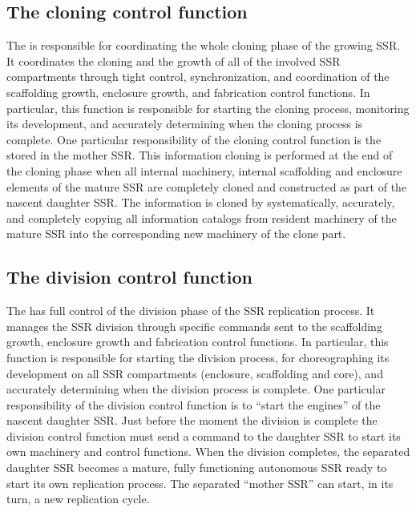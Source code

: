 \subsection[The cloning control function]{The cloning control function}

The  is responsible for coordinating the whole cloning phase of the
growing SSR. It coordinates the cloning and the
growth of all of the involved SSR compartments through tight control,
synchronization, and coordination of the scaffolding growth, enclosure
growth, and fabrication control functions. In particular, this function is responsible
for starting the cloning process, monitoring its development,
and accurately determining when the cloning process is complete. One
particular responsibility of the cloning control function is the
 stored in the mother SSR. This
information cloning is performed at the end of the cloning phase when
all internal machinery, internal scaffolding and enclosure elements of
the mature SSR are completely cloned and constructed as part of the
nascent daughter SSR. The information is cloned by systematically,
accurately, and completely copying all information catalogs from
resident machinery of the mature SSR into the corresponding new
machinery of the clone part.

\subsection[The division control function]{The division control function}

The  has full control of the division phase of the SSR replication
process. It manages the SSR division through specific commands sent to
the scaffolding growth, enclosure growth and fabrication control
functions.  In particular, this function is responsible for starting the
division process, for choreographing its development on all SSR
compartments (enclosure, scaffolding and core), and accurately
determining when the division process is complete. One particular
responsibility of the division control function is to “start the
engines” of the nascent daughter SSR. Just before the moment the
division is complete the division control function must send a command
to the daughter SSR to start its own machinery and control functions.
When the division completes, the separated daughter SSR
becomes a mature, fully functioning autonomous SSR ready to start its
own replication process. The separated “mother SSR” can start, in its
turn, a new replication cycle.

